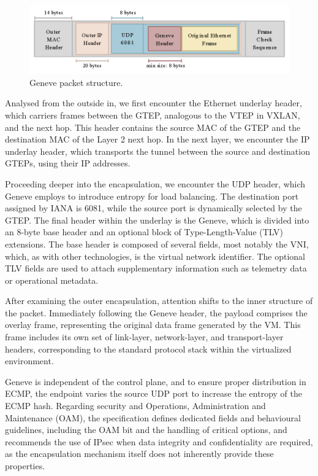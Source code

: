 \begin{figure} [H]
    \centering
    \includegraphics[width=0.65\linewidth]{Figures/genevePacket.png}
    \caption{Geneve packet structure. \cite{Geneve}}
    \label{geneve}
\end{figure}

Analysed from the outside in, we first encounter the Ethernet underlay header, which carriers frames between the GTEP, analogous to the VTEP in VXLAN, and the next hop. This header contains the source MAC of the GTEP and the destination MAC of the Layer 2 next hop. In the next layer, we encounter the IP underlay header, which transports the tunnel between the source and destination GTEPs, using their IP addresses.

Proceeding deeper into the encapsulation, we encounter the UDP header, which Geneve employs to introduce entropy for load balancing. The destination port assigned by IANA is 6081, while the source port is dynamically selected by the GTEP. The final header within the underlay is the Geneve, which is divided into an 8-byte base header and an optional block of Type-Length-Value (TLV) extensions. The base header is composed of several fields, most notably the VNI, which, as with other technologies, is the virtual network identifier. The optional TLV fields are used to attach supplementary information such as telemetry data or operational metadata.

After examining the outer encapsulation, attention shifts to the inner structure of the packet. Immediately following the Geneve header, the payload comprises the overlay frame, representing the original data frame generated by the VM. This frame includes its own set of link-layer, network-layer, and transport-layer headers, corresponding to the standard protocol stack within the virtualized environment.

Geneve is independent of the control plane, and to ensure proper distribution in ECMP, the endpoint varies the source UDP port to increase the entropy of the ECMP hash. Regarding security and Operations, Administration and Maintenance (OAM), the specification defines dedicated fields and behavioural guidelines, including the OAM bit and the handling of critical options, and recommends the use of IPsec when data integrity and confidentiality are required, as the encapsulation mechanism itself does not inherently provide these properties. 

